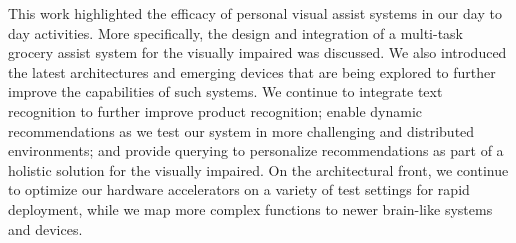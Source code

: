 This work highlighted the efficacy of personal visual assist systems in our day to day activities. 
More specifically, the design and integration of a multi-task grocery assist system for the visually impaired was 
discussed. We also introduced the latest architectures and emerging devices that are being explored to further improve the capabilities of such systems. 
We continue to integrate text recognition to further improve product recognition; enable dynamic recommendations as we test our system in more challenging 
and distributed environments; and provide querying to personalize recommendations as part of a holistic solution for the visually impaired. On the architectural front, 
we continue to optimize our hardware accelerators on a variety of test settings for rapid deployment, 
while we map more complex functions to newer brain-like systems and devices.

